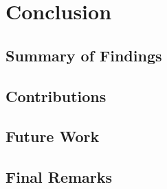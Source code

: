 \chapter{Conclusion}
\label{ch:conclusion}

\lipsum[39-40]

\section{Summary of Findings}
\label{sec:summary-of-findings}

\lipsum[41-42]

\section{Contributions}
\label{sec:contributions}

\lipsum[43]

\section{Future Work}
\label{sec:future-work}

\lipsum[44-45]

\section{Final Remarks}
\label{sec:final-remarks}

\lipsum[46]